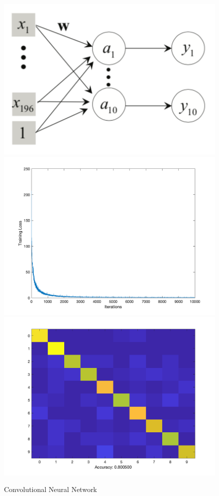 \documentclass[letter, 10pt]{article}
\begin{document}
\begin{figure}[H]
        \centering
        \includegraphics[width=\textwidth]{HW4/RESULT/SLP_linear.png}
    \endminipage\hfill
        \centering
        \includegraphics[width=1.1\textwidth]{HW4/RESULT/SLP_linear_loss.png}
    \endminipage\hfill
        \centering
        \includegraphics[width=1.1\textwidth]{HW4/RESULT/SLPLINEAR_CONFUSION.png}
    \endminipage\hfill
    \caption{Convolutional Neural Network}
\end{figure}
\end{document}
